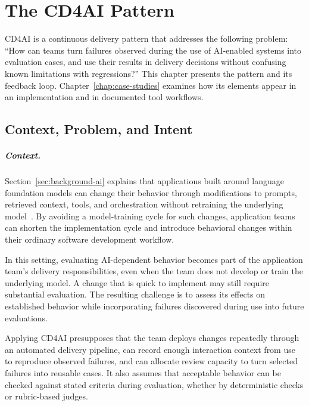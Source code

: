 \chapter{The CD4AI Pattern}
\label{chap:cd4ai}

CD4AI is a continuous delivery pattern that addresses the following problem:
\enquote{How can teams turn failures observed during the use of AI-enabled
systems into evaluation cases, and use their results in delivery decisions
without confusing known limitations with regressions?}
This chapter presents the pattern and its feedback loop.
Chapter~\ref{chap:case-studies} examines how its elements appear in an
implementation and in documented tool workflows.

\section{Context, Problem, and Intent}
\label{sec:cd4ai-context}

\paragraph{Context.}
Section~\ref{sec:background-ai} explains that applications built around
language foundation models can change their behavior through modifications to
prompts, retrieved context, tools, and orchestration without retraining the
underlying model~\parencite{Schluntz:BuildingEffectiveAgents:2024}. By avoiding
a model-training cycle for such changes, application teams can shorten the
implementation cycle and introduce behavioral changes within their ordinary
software development workflow.

In this setting, evaluating AI-dependent behavior becomes part of the
application team's delivery responsibilities, even when the team does not
develop or train the underlying model. A change that is quick to implement
may still require substantial evaluation. The resulting challenge is to assess
its effects on established behavior while incorporating failures discovered
during use into future evaluations.

Applying CD4AI presupposes that the team deploys changes repeatedly through an
automated delivery pipeline, can record enough interaction context from use to
reproduce observed failures, and can allocate review capacity to turn selected
failures into reusable cases. It also assumes that acceptable behavior can be
checked against stated criteria during evaluation, whether by deterministic
checks or rubric-based judges.

